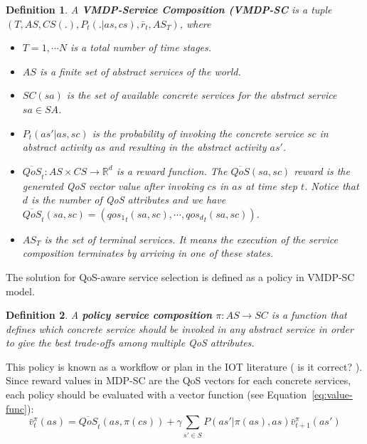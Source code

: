 \documentclass[10pt,journal,compsoc]{IEEEtran}
\newtheorem{definition}{Definition}
\begin{document}
\begin{definition}
A \textbf{VMDP-Service Composition (VMDP-SC} is a tuple $(T, AS, CS(.), P_t(.|as,cs), \bar{r}_t, AS_T)$, where  

\begin{itemize}
\item[ -] $T= 1, \cdots N$ is a total number of time stages. 
\item[-] $AS$ is a finite set of abstract services of the world.
\item[-] $SC(sa)$ is the set of available concrete services for the abstract service $sa \in SA$.
\item[-] $P_t(as' |as, sc )$ is the probability of invoking the concrete service $sc$ in abstract activity $as$ and resulting in the abstract activity $as'$.
\item[-] $ \overline{QoS}_t: AS \times CS \longrightarrow \mathbb{R}^d$ is a reward function. The $\overline{QoS}(sa, sc)$ reward is the generated QoS vector value after invoking $cs$ in $as$ at time step $t$. Notice that $d$ is the number of QoS attributes and we have $\overline{QoS}_t(sa, sc) = ({qos_1}_t(sa,sc), \cdots, {qos_d}_t(sa,sc))$. 
\item[-] $AS_T$ is the set of terminal services. It means the execution of the service composition terminates by arriving in one of these states.
\end{itemize}
\end{definition}

The solution for QoS-aware service selection is defined as a policy in VMDP-SC model.

\begin{definition}
A \textbf{policy service composition} $\pi: AS \longrightarrow SC$ is a function that defines which concrete service should be invoked in any abstract service in order to give the best trade-offs among multiple QoS attributes. 
\end{definition}

This policy is known as a workflow or plan in the IOT literature ( {\color{red} is it correct? }). Since reward values in MDP-SC are the QoS vectors for each concrete services, each policy should be evaluated with a vector function (see Equation~\ref{eq:value-func}):
\begin{equation}
\bar{v}_t^{\pi}(as) = \overline{QoS}_t(as, \pi(cs)) + \gamma \sum_{s' \in S} P(as' | \pi(as), as) \bar{v}_{t+1}^{\pi}(as')
\end{equation}
\end{document}
